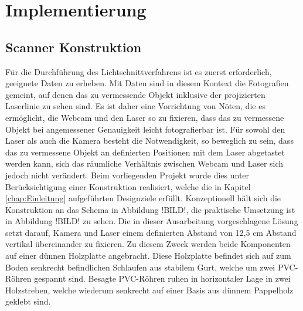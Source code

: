 \chapter{Implementierung}
\label{chap:Implementierung}

\section{Scanner Konstruktion}
\label{sec:scannerKonstruktion}
Für die Durchführung des Lichtschnittverfahrens ist es zuerst erforderlich, geeignete Daten zu erheben. Mit Daten sind in diesem Kontext die Fotografien gemeint, auf denen das zu vermessende Objekt inklusive der projizierten Laserlinie zu sehen sind. Es ist daher eine Vorrichtung von Nöten, die es ermöglicht, die Webcam und den Laser so zu fixieren, dass das zu vermessene Objekt bei angemessener Genauigkeit leicht fotografierbar ist. Für sowohl den Laser als auch die Kamera besteht die Notwendigkeit, so beweglich zu sein, dass das zu vermessene Objekt an definierten Positionen mit dem Laser abgetastet werden kann, sich das räumliche Verhältnis zwischen Webcam und Laser sich jedoch nicht verändert. Beim vorliegenden Projekt wurde dies unter Berücksichtigung einer Konstruktion realisiert, welche die in Kapitel \ref{chap:Einleitung} aufgeführten Designziele erfüllt. Konzeptionell hält sich die Konstruktion an das Schema in Abbildung !BILD!, die praktische Umsetzung ist in Abbildung !BILD! zu sehen. Die in dieser Ausarbeitung vorgeschlagene Lösung setzt darauf, Kamera und Laser einem definierten Abstand von 12,5 cm Abstand vertikal übereinander zu fixieren. Zu diesem Zweck werden beide Komponenten auf einer dünnen Holzplatte angebracht. Diese Holzplatte befindet sich auf zum Boden senkrecht befindlichen Schlaufen aus stabilem Gurt, welche um zwei PVC-Röhren gespannt sind. Besagte PVC-Röhren ruhen in horizontaler Lage in zwei Holzstreben, welche wiederum senkrecht auf einer Basis aus dünnem Pappelholz geklebt sind. 



